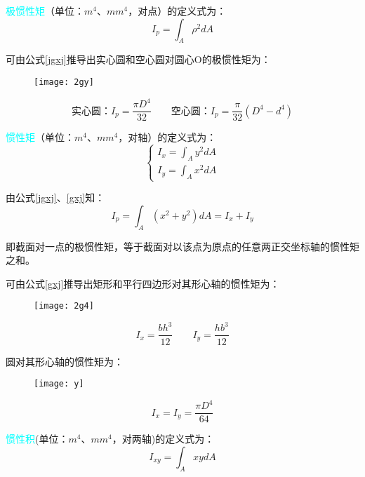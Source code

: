 \documentclass[10pt,a4paper]{ctexart}
\begin{document}
\textcolor{cyan}{极惯性矩}（单位：$m^4$、$mm^4$，对点）的定义式为：
\begin{equation}
	I_p=\int_A\rho^2dA
	\label{jgxj}
\end{equation}

可由公式\ref{jgxj}推导出实心圆和空心圆对圆心O的极惯性矩为：
\begin{figure}[htp]%
	\centering
	\texttt{[image: 2gy]}
\end{figure}

\begin{equation}%
\mbox{实心圆：} I_p=\frac{\pi D^4}{32} \qquad \mbox{空心圆：} I_p=\frac{\pi}{32}(D^4-d^4)
\label{yjgxj}
\end{equation}

\textcolor{cyan}{惯性矩}（单位：$m^4$、$mm^4$，对轴）的定义式为：
\begin{equation}
\begin{cases}
I_x=\int_A y^2dA\\
I_y=\int_A x^2dA
\end{cases}
\label{gxj}
\end{equation}

由公式\ref{jgxj}、\ref{gxj}知：
\begin{equation}
	I_p=\int_A(x^2+y^2)dA=I_x+I_y
\end{equation}

即截面对一点的极惯性矩，等于截面对以该点为原点的任意两正交坐标轴的惯性矩之和。

可由公式\ref{gxj}推导出矩形和平行四边形对其形心轴的惯性矩为：
\begin{figure}[htp]%
	\centering
	\texttt{[image: 2g4]}
\end{figure}
\begin{equation}
	I_x=\frac{bh^3}{12} \qquad I_y=\frac{hb^3}{12}
	\label{jg}
\end{equation}

圆对其形心轴的惯性矩为：
\begin{figure}[htp]%
	\centering
	\texttt{[image: y]}
\end{figure}
\begin{equation}
	I_x=I_y=\frac{\pi D^4}{64}
	\label{yg}
\end{equation}

\textcolor{cyan}{惯性积}(单位：$m^4$、$mm^4$，对两轴)的定义式为：
\begin{equation}
I_{xy}=\int_A xydA
\end{equation}
\end{document}
